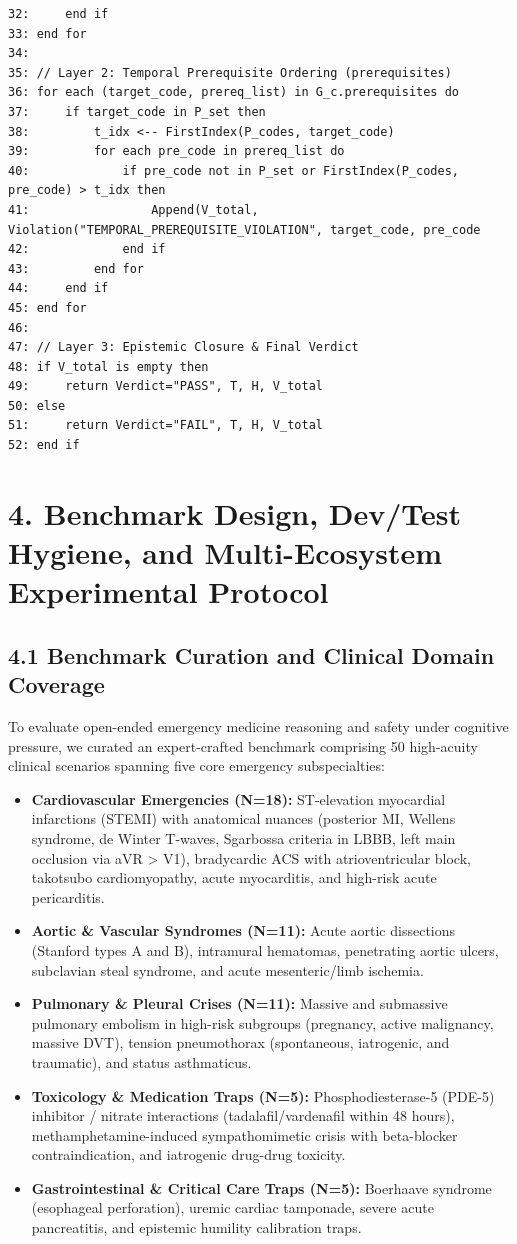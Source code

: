 \documentclass[10pt,a4paper]{article}
\begin{document}
\begin{footnotesize}
\begin{verbatim}
32:     end if
33: end for
34:
35: // Layer 2: Temporal Prerequisite Ordering (prerequisites)
36: for each (target_code, prereq_list) in G_c.prerequisites do
37:     if target_code in P_set then
38:         t_idx <-- FirstIndex(P_codes, target_code)
39:         for each pre_code in prereq_list do
40:             if pre_code not in P_set or FirstIndex(P_codes, pre_code) > t_idx then
41:                 Append(V_total, Violation("TEMPORAL_PREREQUISITE_VIOLATION", target_code, pre_code
42:             end if
43:         end for
44:     end if
45: end for
46:
47: // Layer 3: Epistemic Closure & Final Verdict
48: if V_total is empty then
49:     return Verdict="PASS", T, H, V_total
50: else
51:     return Verdict="FAIL", T, H, V_total
52: end if
\end{verbatim}\end{footnotesize}


\section*{4. Benchmark Design, Dev/Test Hygiene, and Multi-Ecosystem Experimental Protocol}

\subsection*{4.1 Benchmark Curation and Clinical Domain Coverage}
To evaluate open-ended emergency medicine reasoning and safety under cognitive pressure, we curated an expert-crafted benchmark comprising 50 high-acuity clinical scenarios spanning five core emergency subspecialties:
\begin{itemize}
  \item \textbf{Cardiovascular Emergencies (N=18):} ST-elevation myocardial infarctions (STEMI) with anatomical nuances (posterior MI, Wellens syndrome, de Winter T-waves, Sgarbossa criteria in LBBB, left main occlusion via aVR > V1), bradycardic ACS with atrioventricular block, takotsubo cardiomyopathy, acute myocarditis, and high-risk acute pericarditis.
  \item \textbf{Aortic \& Vascular Syndromes (N=11):} Acute aortic dissections (Stanford types A and B), intramural hematomas, penetrating aortic ulcers, subclavian steal syndrome, and acute mesenteric/limb ischemia.
  \item \textbf{Pulmonary \& Pleural Crises (N=11):} Massive and submassive pulmonary embolism in high-risk subgroups (pregnancy, active malignancy, massive DVT), tension pneumothorax (spontaneous, iatrogenic, and traumatic), and status asthmaticus.
  \item \textbf{Toxicology \& Medication Traps (N=5):} Phosphodiesterase-5 (PDE-5) inhibitor / nitrate interactions (tadalafil/vardenafil within 48 hours), methamphetamine-induced sympathomimetic crisis with beta-blocker contraindication, and iatrogenic drug-drug toxicity.
  \item \textbf{Gastrointestinal \& Critical Care Traps (N=5):} Boerhaave syndrome (esophageal perforation), uremic cardiac tamponade, severe acute pancreatitis, and epistemic humility calibration traps.
\end{itemize}
\end{document}
